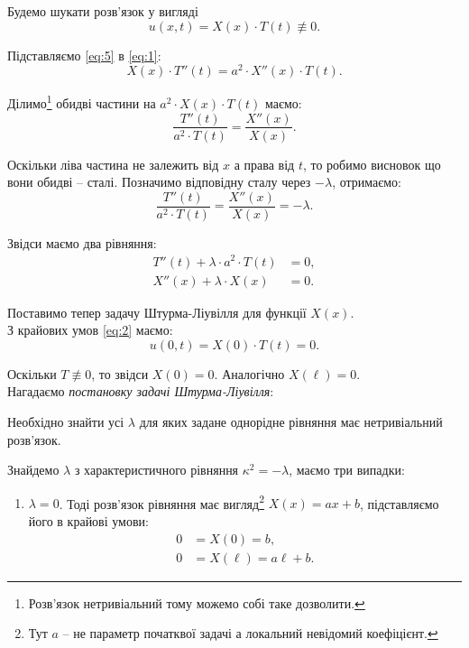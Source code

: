 \begin{solution}
	Будемо шукати розв'язок у вигляді
	\begin{equation}
		\label{eq:5}
		u(x, t) = X(x) \cdot T(t) \not\equiv 0.
	\end{equation}

	Підставляємо \eqref{eq:5} в \eqref{eq:1}:
	\begin{equation*}
		X(x) \cdot T''(t) = a^2 \cdot X''(x) \cdot T(t).
	\end{equation*}

	Ділимо\footnote{Розв'язок нетривіальний тому можемо собі таке дозволити.} обидві частини на $a^2 \cdot X(x) \cdot T(t)$ маємо:
	\begin{equation*}
		\frac{T''(t)}{a^2 \cdot T(t)} = \frac{X''(x)}{X(x)}.
	\end{equation*}

	Оскільки ліва частина не залежить від $x$ а права від $t$, то робимо висновок що вони обидві -- сталі. Позначимо відповідну сталу через $-\lambda$, отримаємо:
	\begin{equation*}
		\frac{T''(t)}{a^2 \cdot T(t)} = \frac{X''(x)}{X(x)} = - \lambda.
	\end{equation*}

	Звідси маємо два рівняння:
	\begin{align*}
		T''(t) + \lambda \cdot a^2 \cdot T(t) &= 0, \\
		X''(x) + \lambda \cdot X(x) &= 0.
	\end{align*}

	Поставимо тепер задачу Штурма-Ліувілля для функції $X(x)$. \\

	З крайових умов \eqref{eq:2} маємо:
	\begin{equation*}
		u(0, t) = X(0) \cdot T(t) = 0.
	\end{equation*}

	Оскільки $T \not\equiv 0$, то звідси $X(0) = 0$. Аналогічно $X(\ell) = 0$. \\

	Нагадаємо \textit{постановку задачі Штурма-Ліувілля}:

	\begin{problem*}
		Необхідно знайти усі $\lambda$ для яких задане однорідне рівняння має нетривіальний розв'язок.
	\end{problem*}

	Знайдемо $\lambda$ з характеристичного рівняння $\kappa^2 = - \lambda$, маємо три випадки:

	\begin{enumerate}
		\item $\lambda = 0$. Тоді розв'язок рівняння має вигляд\footnote{Тут $a$ -- не параметр початквої задачі а локальний невідомий коефіцієнт.} $X(x) = a x + b$, підставляємо його в крайові умови:
		\begin{align*}
			0 &= X(0) = b, \\
			0 &= X(\ell) = a \ell + b.
		\end{align*}


\end{enumerate}
\end{solution}
